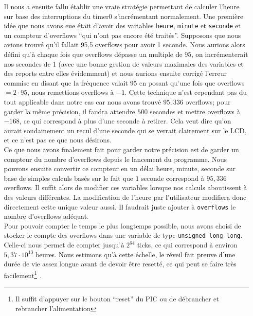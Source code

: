 \documentclass[12pt,a4paper]{article}
\begin{document}
    Il nous a ensuite fallu établir une vraie stratégie permettant de calculer l'heure sur base des interruptions du timer0 s'incrémentant normalement. Une première idée que nous avons eue était d'avoir des variables \texttt{heure}, \texttt{minute} et \texttt{seconde} et un compteur d'overflows ``qui n'ont pas encore été traités''. Supposons que nous avions trouvé qu'il fallait 95,5 overflows pour avoir 1 seconde.
    Nous aurions alors défini qu'à chaque fois que overflows dépasse un multiple de $95$, on incrémenterait nos secondes de 1 (avec une bonne gestion de valeurs maximales des variables et des reports entre elles évidemment) et nous aurions ensuite corrigé l'erreur commise en disant que la fréquence valait 95 en posant qu'une fois que overflows $= 2\cdot 95$, nous remettions overflows à $-1$. Cette technique n'est cependant pas du tout applicable dans notre cas car nous avons trouvé $95,336$ overflows; pour garder la même précision, il faudra attendre $500$ secondes et mettre overflows à $-168$, ce qui correspond à plus d'une seconde à retirer. Cela veut dire qu'on aurait soudainement un recul d'une seconde qui se verrait clairement sur le LCD, et ce n'est pas ce que nous désirons.\\
    
    Ce que nous avons finalement fait pour garder notre précision est de garder un compteur du nombre d'overflows depuis le lancement du programme. Nous pouvons ensuite convertir ce compteur en un délai heure, minute, seconde sur base de simples calculs basés sur le fait que $1$ seconde correspond à $95,336$ overflows. Il suffit alors de modifier ces variables lorsque nos calculs aboutissent à des valeurs différentes. La modification de l'heure par l'utilisateur modifiera donc directement cette unique valeur aussi. Il faudrait juste ajouter à \texttt{overflows} le nombre d'overflows adéquat.\\
    
    Pour pouvoir compter le temps le plus longtemps possible, nous avons choisi de stocker le compte des overflows dans une variable de type \texttt{unsigned long long}. Celle-ci nous permet de compter jusqu'à $2^{64}$ ticks, ce qui correspond à environ $5,37 \cdot 10^{13}$ heures. Nous estimons qu'à cette échelle, le réveil fait preuve d'une durée de vie assez longue avant de devoir être resetté, ce qui peut se faire très facilement\footnote{Il suffit d'appuyer sur le bouton ``reset'' du PIC ou de débrancher et rebrancher l'alimentation} .
\end{document}
